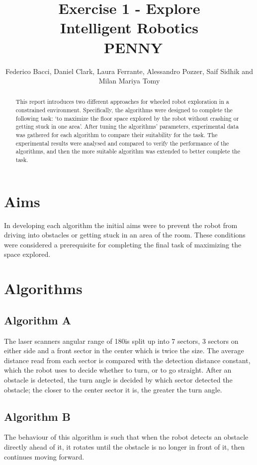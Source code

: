 \documentclass[letterpaper, 10 pt, conference]{ieeeconf}  %
\title{\LARGE \bf
Exercise 1 - Explore \\
Intelligent Robotics \\
	\ \bf PENNY
}
\author{Federico Bacci, Daniel Clark, Laura Ferrante, Alessandro Pozzer, Saif Sidhik and Milan Mariya Tomy}
\begin{document}
\maketitle
\thispagestyle{empty}
\pagestyle{empty}


\begin{abstract}

This report introduces two different approaches for wheeled robot exploration in a constrained environment. Specifically, the algorithms were designed to complete the following task: \lq to maximize the floor space explored by the robot without crashing or getting stuck in one area\rq. After tuning the algorithms’ parameters, experimental data was gathered for each algorithm to compare their suitability for the task. The experimental results were analysed and compared to verify the performance of the algorithms, and then the more suitable algorithm was extended to better complete the task.

\end{abstract}

\section{Aims}
In developing each algorithm the initial aims were to prevent the robot from driving into obstacles or getting stuck in an area of the room. These conditions were considered a prerequisite for completing the final task of maximizing the space explored.

\section{Algorithms}
\subsection{Algorithm A}
The laser scanners angular range of 180\textdegree is split up into 7 sectors, 3 sectors on either side and a front sector in the center which is twice the size. The average distance read from each sector is compared with the detection distance constant, which the robot uses to decide whether to turn, or to go straight. After an obstacle is detected, the turn angle is decided by which sector detected the obstacle; the closer to the center sector it is, the greater the turn angle.

\subsection{Algorithm B}
The behaviour of this algorithm is such that when the robot detects an obstacle directly ahead of it, it rotates until the obstacle is no longer in front of it, then continues moving forward.
\end{document}
